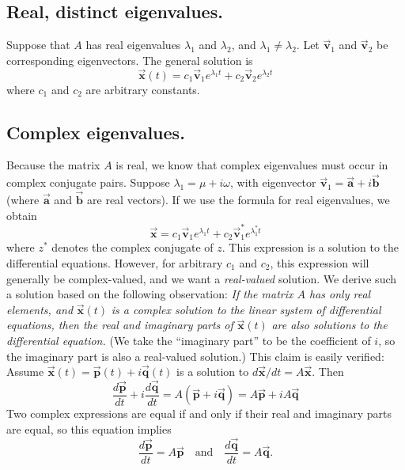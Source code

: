 \documentclass[reqno]{immbook}
\newcommand{\BA}{\vec{\textbf{a}}}
\newcommand{\BB}{\vec{\textbf{b}}}
\newcommand{\BP}{\vec{\textbf{p}}}
\newcommand{\BQ}{\vec{\textbf{q}}}
\newcommand{\BV}{\vec{\textbf{v}}}
\newcommand{\BX}{\vec{\textbf{x}}}
\numberwithin{equation}{chapter}
\numberwithin{question}{section}
\numberwithin{theorem}{chapter}
\numberwithin{figure}{chapter}
\theoremstyle{definition}
\begin{document}
\subsection*{Real, distinct eigenvalues.}
Suppose that $A$ has real eigenvalues $\lambda_1$
and $\lambda_2$, and $\lambda_1 \ne \lambda_2$.
Let $\BV_1$ and $\BV_2$ be corresponding eigenvectors.
The general solution is
\begin{equation}
  \BX(t) = c_1 \BV_1 e^{\lambda_1 t} + c_2 \BV_2 e^{\lambda_2 t}
\label{eqn:gensolreal}
\end{equation}
where $c_1$ and $c_2$ are arbitrary constants.

\subsection*{Complex eigenvalues.}
Because the matrix $A$ is real, we know that complex eigenvalues must
occur in complex conjugate pairs.
Suppose $\lambda_1 = \mu + i\omega$, with eigenvector
$\BV_1=\BA+i\BB$ (where $\BA$ and $\BB$ are real vectors).
If we use the formula for real eigenvalues,
we obtain
\begin{equation}
 \BX = c_1 \BV_1 e^{\lambda_1 t} + c_2 \BV_1^* e^{\lambda_1^* t} 
\end{equation}
where $z^*$ denotes the complex conjugate of $z$.
This expression is a solution to the differential equations.
However, for arbitrary $c_1$ and $c_2$, this expression will
generally be complex-valued, and we want a \emph{real-valued}
solution.
We derive such a solution based on the following observation:
\emph{If the matrix $A$ has only real elements, and} $\BX(t)$
\emph{is a complex solution to the linear system of differential equations,
then the real and imaginary parts of} $\BX(t)$
\emph{are also solutions
to the differential equation.}  (We take the ``imaginary part''
to be the coefficient of $i$, so the imaginary part is also
a real-valued solution.)  This claim is easily verified:
Assume $\BX(t) = \BP(t) + i \BQ(t)$ is a solution to
$d\BX/dt = A\BX$.  Then
\begin{equation}
  \frac{d\BP}{dt} + i\frac{d\BQ}{dt} = A(\BP+i\BQ) = A\BP + iA\BQ
\end{equation}
Two complex expressions are equal if and only if their real
and imaginary parts are equal, so this equation implies
\begin{equation}
  \frac{d\BP}{dt} = A\BP \quad \textrm{and} \quad
  \frac{d\BQ}{dt} = A\BQ.
\end{equation}
\end{document}
